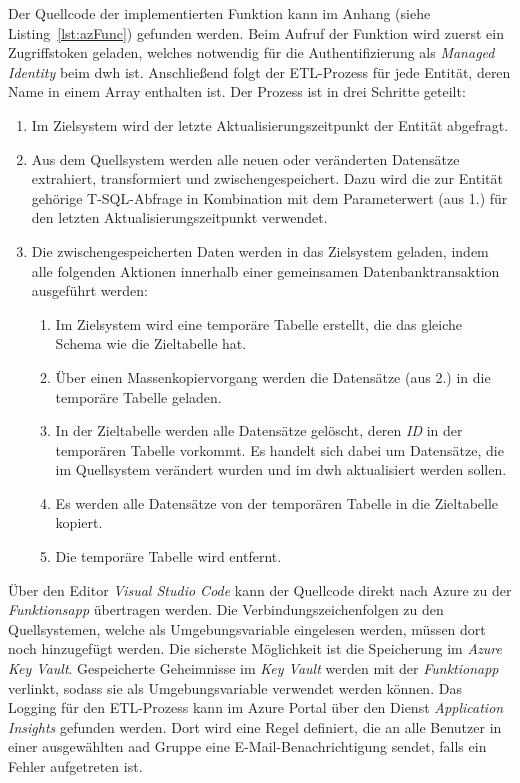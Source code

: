 Der Quellcode der implementierten Funktion kann im Anhang (siehe Listing~\ref{lst:azFunc}) gefunden werden. Beim Aufruf der Funktion wird zuerst ein Zugriffstoken geladen, welches notwendig für die Authentifizierung als \textit{Managed Identity} beim \ac{dwh} ist. Anschließend folgt der ETL-Prozess für jede Entität, deren Name in einem Array enthalten ist. Der Prozess ist in drei Schritte geteilt:

\begin{enumerate}
\item Im Zielsystem wird der letzte Aktualisierungszeitpunkt der Entität abgefragt.
\item Aus dem Quellsystem werden alle neuen oder veränderten Datensätze extrahiert, transformiert und zwischengespeichert. Dazu wird die zur Entität gehörige T-SQL-Abfrage in Kombination mit dem Parameterwert (aus 1.) für den letzten Aktualisierungszeitpunkt verwendet.
\item Die zwischengespeicherten Daten werden in das Zielsystem geladen, indem alle folgenden Aktionen innerhalb einer gemeinsamen Datenbanktransaktion ausgeführt werden:
    \begin{enumerate}[label*=\arabic*.]
    \item Im Zielsystem wird eine temporäre Tabelle erstellt, die das gleiche Schema wie die Zieltabelle hat.
    \item Über einen Massenkopiervorgang werden die Datensätze (aus 2.) in die temporäre Tabelle geladen.
    \item In der Zieltabelle werden alle Datensätze gelöscht, deren \textit{ID} in der temporären Tabelle vorkommt. Es handelt sich dabei um Datensätze, die im Quellsystem verändert wurden und im \ac{dwh} aktualisiert werden sollen.
    \item Es werden alle Datensätze von der temporären Tabelle in die Zieltabelle kopiert.
    \item Die temporäre Tabelle wird entfernt.
    \end{enumerate}
\end{enumerate}

Über den Editor \textit{Visual Studio Code} kann der Quellcode direkt nach Azure zu der \textit{Funktionsapp} übertragen werden. Die Verbindungszeichenfolgen zu den Quellsystemen, welche als Umgebungsvariable eingelesen werden, müssen dort noch hinzugefügt werden. Die sicherste Möglichkeit ist die Speicherung im \textit{Azure Key Vault}. Gespeicherte Geheimnisse im \textit{Key Vault} werden mit der \textit{Funktionapp} verlinkt, sodass sie als Umgebungsvariable verwendet werden können. Das Logging für den ETL-Prozess kann im Azure Portal über den Dienst \textit{Application Insights} gefunden werden. Dort wird eine Regel definiert, die an alle Benutzer in einer ausgewählten \ac{aad} Gruppe eine E-Mail-Benachrichtigung sendet, falls ein Fehler aufgetreten ist.

